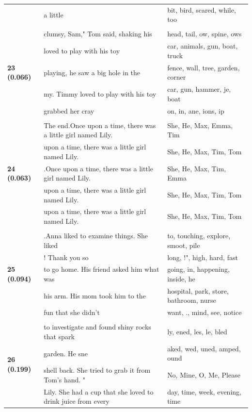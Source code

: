 \documentclass{article}
\theoremstyle{plain}
\theoremstyle{definition}
\theoremstyle{remark}
\begin{document}
\begin{longtable}{|p{}|p{}|p{}|}
& a little & bit,  bird,  scared,  while,  too \\
& & \\
\multirow{5}{*}{\textbf{23 (0.066)}} & clumsy, Sam," Tom said, shaking his & head,  tail, ow,  spine, ows \\
& loved to play with his toy & car,  animals,  gun,  boat,  truck \\
& playing, he saw a big hole in the & fence,  wall,  tree,  garden,  corner \\
& my. Timmy loved to play with his toy & car,  gun,  hammer,  je,  boat \\
& grabbed her cray & on, in, ane, ions, ip \\
& & \\
\multirow{5}{*}{\textbf{24 (0.063)}} & The end.Once upon a time, there was a little girl named Lily. & She,  He,  Max,  Emma,  Tim \\
& upon a time, there was a little girl named Lily. & She,  He,  Max,  Tim,  Tom \\
& .Once upon a time, there was a little girl named Lily. & She,  He,  Max,  Tim,  Emma \\
& upon a time, there was a little girl named Lily. & She,  He,  Max,  Tim,  Tom \\
& upon a time, there was a little girl named Lily. & She,  He,  Max,  Tim,  Tom \\
& & \\
\multirow{5}{*}{\textbf{25 (0.094)}} & .Anna liked to examine things. She liked & to,  touching,  explore,  smoot,  pile \\
& ! Thank you so & long, !",  high,  hard,  fast \\
& to go home. His friend asked him what was & going,  in,  happening,  inside,  he \\
& his arm. His mom took him to the & hospital,  park,  store,  bathroom,  nurse \\
& fun that she didn't & want, .,  mind,  see,  notice \\
& & \\
\multirow{5}{*}{\textbf{26 (0.199)}} & to investigate and found shiny rocks that spark & ly, ened, les, le, bled \\
& garden. He sne & aked, wed, uned, amped, ound \\
& shell back. She tried to grab it from Tom's hand.  " & No, Mine, O, Me, Please \\
& Lily. She had a cup that she loved to drink juice from every & day,  time,  week,  evening, time \\

\end{longtable}
\end{document}
